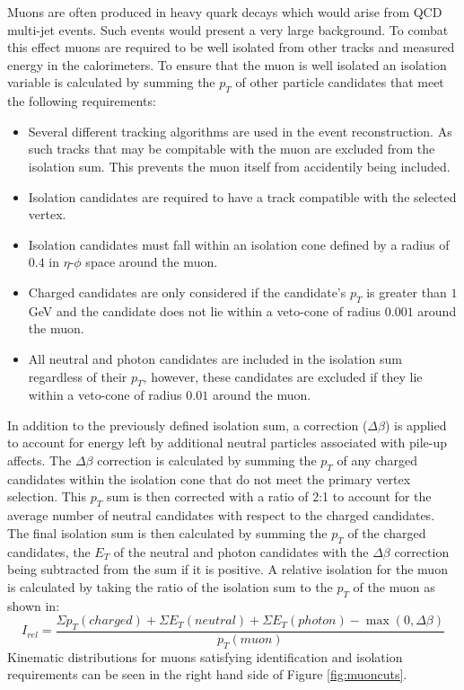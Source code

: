Muons are often produced in heavy quark decays which would arise from QCD multi-jet events. 
Such events would present a very large background. 
To combat this effect muons are required to be well isolated from other tracks and measured energy in the calorimeters.
To ensure that the muon is well isolated an isolation variable is calculated by summing the $p_{T}$ of other particle candidates that meet the following requirements:
\begin{itemize}
\item Several different tracking algorithms are used in the event reconstruction. As such tracks that may be compitable with the muon are excluded from the isolation sum. This prevents the muon itself from accidentily being included.
\item Isolation candidates are required to have a track compatible with the selected vertex.
\item Isolation candidates must fall within an isolation cone defined by a radius of $0.4$ in $\eta$-$\phi$ space around the muon.
\item Charged candidates are only considered if the candidate's $p_{T}$ is greater than $1$ GeV and the candidate does not lie within a veto-cone of radius $0.001$ around the muon.
\item All neutral and photon candidates are included in the isolation sum regardless of their $p_{T}$, however, these candidates are excluded if they lie within a veto-cone of radius $0.01$ around the muon.
\end{itemize}
In addition to the previously defined isolation sum, a correction ($\Delta\beta$) is applied to account for energy left by additional neutral particles associated with pile-up affects.
The $\Delta\beta$ correction is calculated by summing the $p_{T}$ of any charged candidates within the isolation cone that do not meet the primary vertex selection.
This $p_{T}$ sum is then corrected with a ratio of 2:1 to account for the average number of neutral candidates with respect to the charged candidates.
The final isolation sum is then calculated by summing the $p_{T}$ of the charged candidates, the $E_{T}$ of the neutral and photon candidates with the $\Delta\beta$ correction being subtracted from the sum if it is positive.
A relative isolation for the muon is calculated by taking the ratio of the isolation sum to the $p_{T}$ of the muon as shown in:
\begin{equation}
I_{rel} = \frac{\Sigma p_{T}(charged) + \Sigma E_{T}(neutral) + \Sigma E_{T}(photon) - \max(0,\Delta\beta)}{p_{T}(muon)}
\end{equation}
Kinematic distributions for muons satisfying identification and isolation requirements can be seen in the right hand side of Figure \ref{fig:muoncuts}.

